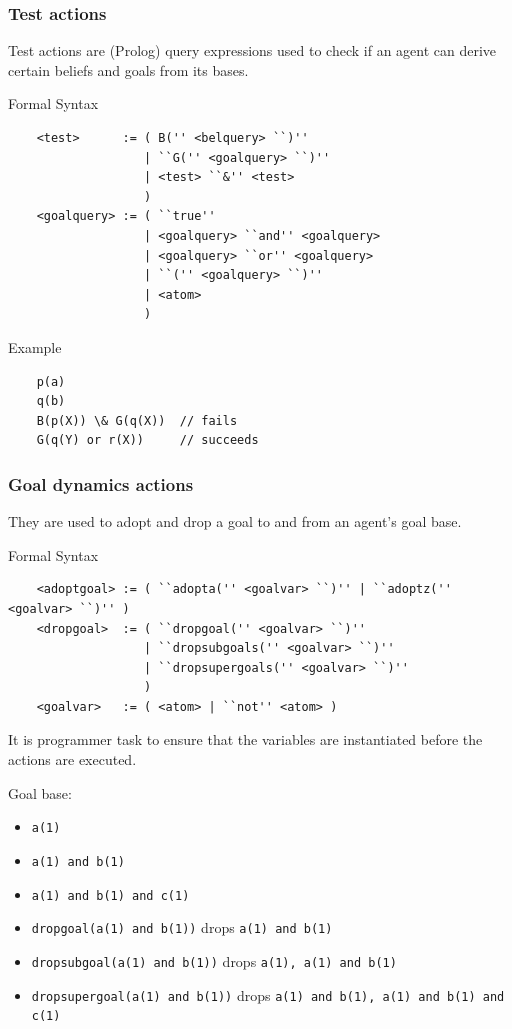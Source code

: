 \documentclass[dvipsnames,usenames,10pt]{beamer}
\newcommand{\bsyntax}{\begin{beamerboxesrounded}[upper=synupcol,lower=synlowcol,shadow=true]{Formal Syntax}}
\newcommand{\esyntax}{\end{beamerboxesrounded}}
\newcommand{\bexample}{\begin{beamerboxesrounded}[upper=exupcol,lower=exlowcol,shadow=true]{Example}}
\newcommand{\eexample}{\end{beamerboxesrounded}}
\begin{document}
\begin{frame}
	\frametitle{Test actions}
	
	Test actions are (Prolog) query expressions used to check if an agent can derive certain beliefs and goals from its bases.
	
	\bsyntax
	\small
	\begin{verbatim}
	<test>      := ( B('' <belquery> ``)'' 
	               | ``G('' <goalquery> ``)''
	               | <test> ``&'' <test>
	               )
	<goalquery> := ( ``true'' 
	               | <goalquery> ``and'' <goalquery>
	               | <goalquery> ``or'' <goalquery>
	               | ``('' <goalquery> ``)''
	               | <atom>
	               )
	\end{verbatim}
	\esyntax
	
	\break

	\bexample
	\begin{verbatim}
	p(a) 
	q(b) 
	B(p(X)) \& G(q(X))	// fails	
	G(q(Y) or r(X))		// succeeds
	\end{verbatim}
	\eexample
\end{frame}

\begin{frame}
	\frametitle{Goal dynamics actions}
	
	They are used to adopt and drop a goal to and from an agent's goal base.

	\bsyntax
	\small
	\begin{verbatim}
	<adoptgoal> := ( ``adopta('' <goalvar> ``)'' | ``adoptz('' <goalvar> ``)'' )
	<dropgoal>  := ( ``dropgoal('' <goalvar> ``)''
	               | ``dropsubgoals('' <goalvar> ``)''
	               | ``dropsupergoals('' <goalvar> ``)''
	               )
	<goalvar>   := ( <atom> | ``not'' <atom> )
	\end{verbatim}
	\esyntax
	
	It is programmer task to ensure that the variables are instantiated before the actions are executed.

	\break

	Goal base:
	\begin{itemize}
		\item \texttt{a(1)}
		\item \texttt{a(1) and b(1)}
		\item \texttt{a(1) and b(1) and c(1)}
	\end{itemize}

	\begin{itemize}
		\item \texttt{dropgoal(a(1) and b(1))}	drops \texttt{a(1) and b(1)}
		\item \texttt{dropsubgoal(a(1) and b(1))} drops \texttt{a(1), a(1) and b(1)}
		\item \texttt{dropsupergoal(a(1) and b(1))} drops \texttt{a(1) and b(1), a(1) and b(1) and c(1)}
	\end{itemize}
\end{frame}
\end{document}
